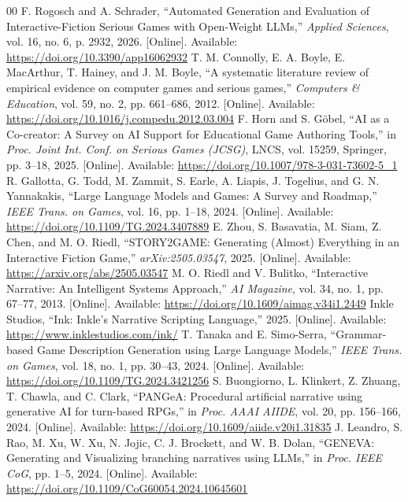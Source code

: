 \documentclass[conference]{IEEEtran}
\begin{document}
\begin{thebibliography}{00}
 F. Rogosch and A. Schrader, ``Automated Generation and Evaluation of Interactive-Fiction Serious Games with Open-Weight LLMs,'' \textit{Applied Sciences}, vol. 16, no. 6, p. 2932, 2026. [Online]. Available: \url{https://doi.org/10.3390/app16062932}
 T. M. Connolly, E. A. Boyle, E. MacArthur, T. Hainey, and J. M. Boyle, ``A systematic literature review of empirical evidence on computer games and serious games,'' \textit{Computers \& Education}, vol. 59, no. 2, pp. 661--686, 2012. [Online]. Available: \url{https://doi.org/10.1016/j.compedu.2012.03.004}
 F. Horn and S. Göbel, ``AI as a Co-creator: A Survey on AI Support for Educational Game Authoring Tools,'' in \textit{Proc. Joint Int. Conf. on Serious Games (JCSG)}, LNCS, vol. 15259, Springer, pp. 3--18, 2025. [Online]. Available: \url{https://doi.org/10.1007/978-3-031-73602-5_1}
 R. Gallotta, G. Todd, M. Zammit, S. Earle, A. Liapis, J. Togelius, and G. N. Yannakakis, ``Large Language Models and Games: A Survey and Roadmap,'' \textit{IEEE Trans. on Games}, vol. 16, pp. 1--18, 2024. [Online]. Available: \url{https://doi.org/10.1109/TG.2024.3407889}
 E. Zhou, S. Basavatia, M. Siam, Z. Chen, and M. O. Riedl, ``STORY2GAME: Generating (Almost) Everything in an Interactive Fiction Game,'' \textit{arXiv:2505.03547}, 2025. [Online]. Available: \url{https://arxiv.org/abs/2505.03547}
 M. O. Riedl and V. Bulitko, ``Interactive Narrative: An Intelligent Systems Approach,'' \textit{AI Magazine}, vol. 34, no. 1, pp. 67--77, 2013. [Online]. Available: \url{https://doi.org/10.1609/aimag.v34i1.2449}
 Inkle Studios, ``Ink: Inkle's Narrative Scripting Language,'' 2025. [Online]. Available: \url{https://www.inklestudios.com/ink/}
 T. Tanaka and E. Simo-Serra, ``Grammar-based Game Description Generation using Large Language Models,'' \textit{IEEE Trans. on Games}, vol. 18, no. 1, pp. 30--43, 2024. [Online]. Available: \url{https://doi.org/10.1109/TG.2024.3421256}
 S. Buongiorno, L. Klinkert, Z. Zhuang, T. Chawla, and C. Clark, ``PANGeA: Procedural artificial narrative using generative AI for turn-based RPGs,'' in \textit{Proc. AAAI AIIDE}, vol. 20, pp. 156--166, 2024. [Online]. Available: \url{https://doi.org/10.1609/aiide.v20i1.31835}
 J. Leandro, S. Rao, M. Xu, W. Xu, N. Jojic, C. J. Brockett, and W. B. Dolan, ``GENEVA: Generating and Visualizing branching narratives using LLMs,'' in \textit{Proc. IEEE CoG}, pp. 1--5, 2024. [Online]. Available: \url{https://doi.org/10.1109/CoG60054.2024.10645601}

\end{thebibliography}
\end{document}
